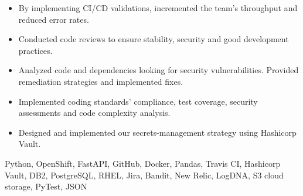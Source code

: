 \begin{experiences}
{\begin{itemize}
                \item By implementing CI/CD validations, incremented the team's throughput and
                    reduced error rates.
                \item Conducted code reviews to ensure stability, security and good development practices.
                \item Analyzed code and dependencies looking for security vulnerabilities.
                    Provided remediation strategies and implemented fixes.
                \item Implemented coding standards' compliance, test coverage, security assessments and code 
                    complexity analysis.
                \item Designed and implemented our secrets-management strategy 
                    using Hashicorp Vault.
            \end{itemize}
        }
        {
            Python,
            OpenShift,
            FastAPI,
            GitHub,
            Docker,
            Pandas,
            Travis CI,
            Hashicorp Vault,
            DB2,
            PostgreSQL,
            RHEL,
            Jira,
            Bandit,
            New Relic,
            LogDNA,
            S3 cloud storage,
            PyTest,
            JSON
        }


\end{experiences}
